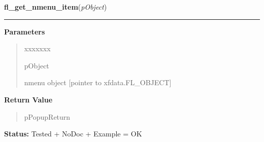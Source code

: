 \hspace{.8\funcindent}\begin{boxedminipage}{\funcwidth}

    \raggedright \textbf{fl\_get\_nmenu\_item}(\textit{pObject})

    \vspace{-1.5ex}

    \rule{\textwidth}{0.5\fboxrule}
\setlength{\parskip}{2ex}
\setlength{\parskip}{1ex}
      \textbf{Parameters}
      \vspace{-1ex}

      \begin{quote}
        \begin{Ventry}{xxxxxxx}

          \item[pObject]

          nmenu object [pointer to xfdata.FL\_OBJECT]

        \end{Ventry}

      \end{quote}

      \textbf{Return Value}
    \vspace{-1ex}

      \begin{quote}
      pPopupReturn

      \end{quote}

\textbf{Status:} Tested + NoDoc + Example = OK



    \end{boxedminipage}

    \label{xformslib:library:fl_get_nmenu_item_by_value}

    \vspace{0.5ex}

